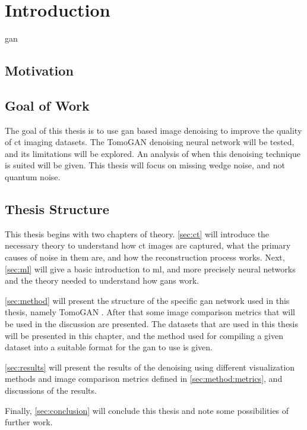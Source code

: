 \chapter{Introduction}
\label{sec:introduction}
\todo[inline]{}
\gls{gan}

\section{Motivation}

\section{Goal of Work}
\todo[inline]{}
The goal of this thesis is to use \gls{gan} based image denoising to improve the quality of \gls{ct} imaging datasets. The TomoGAN \cite{liu2020tomogan} denoising neural network will be tested, and its limitations will be explored. An analysis of when this denoising technique is suited will be given. This thesis will focus on missing wedge noise, and not quantum noise. 

\section{Thesis Structure}
This thesis begins with two chapters of theory. \cref{sec:ct} will introduce the necessary theory to understand how \gls{ct} images are captured, what the primary causes of noise in them are, and how the reconstruction process works. Next, \cref{sec:ml} will give a basic introduction to \gls{ml}, and more precisely neural networks and the theory needed to understand how \gls{gan}s work. 

\cref{sec:method} will present the structure of the specific \gls{gan} network used in this thesis, namely TomoGAN \cite{liu2020tomogan}. After that some image comparison metrics that will be used in the discussion are presented. The datasets that are used in this thesis will be presented in this chapter, and the method used for compiling a given dataset into a suitable format for the \gls{gan} to use is given. 

\cref{sec:results} will present the results of the denoising using different visualization methods and image comparison metrics defined in \cref{sec:method:metrics}, and discussions of the results. 

Finally, \cref{sec:conclusion} will conclude this thesis and note some possibilities of further work. 